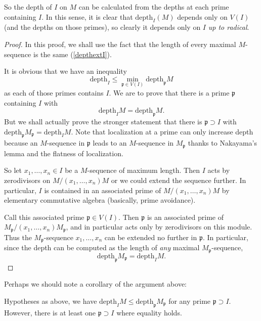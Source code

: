 So the depth of $I$ on $M$ can be calculated  from the depths at each
prime containing $I$. In this sense, it is clear that $\mathrm{depth}_I (M)$ depends
only on $V(I)$ (and the depths on those primes), so clearly it depends only on
$I$ \emph{up to radical}.

\begin{proof} 
In this proof, we shall {use the fact that the length of every maximal
$M$-sequence is the same} (\cref{depthextI}).

It is obvious that we have an inequality
\[ \mathrm{depth}_I \leq  \min_{\mathfrak{p} \in V(I)} \mathrm{depth}_{\mathfrak{p}} M \]
as each of those primes contains $I$. 
We are to prove that there is 
a prime $\mathfrak{p}$ containing $I$ with
\[ \mathrm{depth}_I M = \mathrm{depth}_{\mathfrak{p}} M . \]
But we shall actually prove the stronger statement that there is $\mathfrak{p}
\supset I$ with $\mathrm{depth}_{\mathfrak{p}} M_{\mathfrak{p}} = \mathrm{depth}_I M$. Note
that localization at a prime can only increase depth because an $M$-sequence in
$\mathfrak{p}$ leads to an $M$-sequence in $M_{\mathfrak{p}}$ thanks to
Nakayama's lemma and the flatness of localization.

So let $x_1, \dots, x_n \in I$ be a $M$-sequence of maximum length. Then $I$
acts by zerodivisors on 
$M/(x_1 , \dots, x_n) M$ or we could extend the sequence further. 
In particular, $I$ is contained in an associated prime of $M/(x_1, \dots, x_n)
M$ by elementary commutative algebra (basically, prime avoidance).

Call this associated prime $\mathfrak{p} \in V(I)$. Then $\mathfrak{p}$ is an
associated prime of $M_{\mathfrak{p}}/(x_1, \dots, x_n) M_{\mathfrak{p}}$,
and in particular acts only by zerodivisors on this module. 
Thus the $M_{\mathfrak{p}}$-sequence $x_1, \dots, x_n$ can be extended no
further in $\mathfrak{p}$. In particular, since  the depth
can be computed as the length of \emph{any} maximal $M_{\mathfrak{p}}$-sequence,
\[ \mathrm{depth}_{\mathfrak{p}} M_{\mathfrak{p}} = \mathrm{depth}_I M. \]
\end{proof} 

Perhaps we should note a corollary of the argument above:
\begin{corollary} \label{depthlocal2}
Hypotheses as above, we have $\mathrm{depth}_I M  \leq \mathrm{depth}_\mathfrak{p} M_{\mathfrak{p}}$ for
any prime $\mathfrak{p} \supset I$. However, there is at least one $\mathfrak{p}
\supset I$ where equality holds. \end{corollary}

